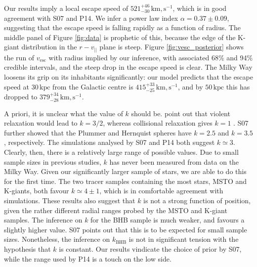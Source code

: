 \documentclass[useAMS,twocolumn,usenatbib]{mn2e}
\def\kpc{{\,\mathrm{kpc}}}
\def\km,s{{\,\mathrm{km,s^{-1}}}}
\def\vlos{{v_{||}}}
\def\vesc{{v_\mathrm{esc}}}
\begin{document}
Our results imply a local escape speed of $521^{+46}_{-30}\km,s$, which is in good agreement with S07 and P14.  
We infer a power law index $\alpha = 0.37\pm0.09$, suggesting that the escape speed is falling rapidly as a function of radius.
The middle panel of Figure \ref{fig:data} is prophetic of this, because the edge of the K-giant distribution in the $r-\vlos$ plane is steep.
Figure \ref{fig:vesc_posterior} shows the run of $\vesc$ with radius implied by our inference, with associated 68\% and 94\% credible intervals, and the steep drop in the escape speed is clear.
The Milky Way loosens its grip on its inhabitants significantly: our model predicts that the escape speed at $30\kpc$ from the Galactic centre is $415^{+33}_{-25}\km,s$, and by $50\kpc$ this has dropped to $379^{+34}_{-28}\km,s$.

A priori, it is unclear what the value of $k$ should be. 
\citet{Le90} point out that violent relaxation would lead to $k=3/2$, whereas collisional relaxation gives $k=1$ \citep{Sp72}. 
S07 further showed that the Plummer and Hernquist spheres \citep{BT08} have $k=2.5$ and $k=3.5$, respectively. 
The simulations analysed by S07 and P14 both suggest $k\simeq3$. 
Clearly, then, there is a relatively large range of possible values.  
Due to small sample sizes in previous studies, $k$ has never been measured from data on the Milky Way. 
Given our significantly larger sample of stars, we are able to do this for the first time. 
The two tracer samples containing the most stars, MSTO and K-giants, both favour $k\simeq4\pm1$, which is in comfortable agreement with simulations.
These results also suggest that $k$ is not a strong function of position, given the rather different radial ranges probed by the MSTO and K-giant samples.
The inference on $k$ for the BHB sample is much weaker, and favours a slightly higher value. 
S07 points out that this is to be expected for small sample sizes. 
Nonetheless, the inference on $k_\mathrm{BHB}$ is not in significant tension with the hypothesis that $k$ is constant. 
Our results vindicate the choice of prior by S07, while the range used by P14 is a touch on the low side.
\end{document}
